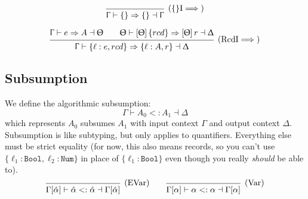 \documentclass{article}
\newcommand{\rcd}[1]{\{#1\}}
\newcommand{\spc}{\qquad}
\newcommand{\ctx}{\Upgamma}
\newcommand{\ctxalt}{\Updelta}
\newcommand{\ctxaltt}{\Uptheta}
\newcommand{\lbl}{\ell}
\newcommand{\row}{r}
\newcommand{\ev}{\hat}
\newcommand{\ctxinout}[3]{#1 \vdash #2 \dashv #3}
\newcommand{\synth}[4]{\ctxinout {#1} {#2 \Rightarrow #3} {#4}}
\renewcommand{\check}[4]{\ctxinout {#1} {#2 \Leftarrow #3} {#4}}
\newcommand{\subsume}{<:}
\newcommand{\subsumes}[4]{\ctxinout {#1} {#2 \subsume #3} {#4}}
\newcommand{\synthesizes}{\Rightarrow \!\!\! \Rightarrow}
\newcommand{\presynth}[6]{\ctxinout {#1} {#2 #3 #4 \synthesizes #5} {#6}}
\newcommand{\B}{\mathcal{B}}
\newcommand{\prjSymbol}{.}
\newcommand{\prj}{\,\prjSymbol\,}
\newcommand{\apply}[1]{\left[#1\right]}
\newcommand{\lookup}[5]{#1 \vdash #2 \# #3 \longrightarrow #4 \dashv #5}
\newcommand{\deduct}[3][]
{
  \begin{prooftree}
    \hypo{#2}
    \infer1[\text{#1}]{#3}
  \end{prooftree}
}
\begin{document}
\[
\deduct[(\{\}I\(\implies\))]{}{\synth{\ctx}{\{\}}{\{\}}{\ctx}}
\]

\[
  \deduct[(RcdI\(\implies\))]
  { \synth{\ctx}{e}{A}{\ctxaltt} \spc \synth{\ctxaltt}{\apply\ctxaltt \rcd
        {rcd}}{\apply\ctxaltt \row}{\ctxalt} }
  { \synth{\ctx}{\{\lbl : e , rcd \}}{\{\lbl : A, \row\}}{\ctxalt} }
\]






\subsection{Subsumption}
We define the algorithmic subsumption:
\[
\subsumes{\Gamma}{A_0}{A_1}{\Delta}
\]
which represents $A_0$ subsumes $A_1$ with input context $\Gamma$ and output
context $\Delta$. Subsumption is like subtyping, but only applies to
quantifiers. Everything else must be strict equality (for now, this also means
records, so you can't use \(\{\lbl_1: \texttt{Bool}, \lbl_2: \texttt{Num}\}\) in
place of \(\{\lbl_1 : \texttt{Bool}\}\) even though you really \emph{should} be
able to).
\[
  \deduct[(EVar)]{}{\subsumes{\Gamma[\ev\alpha]}{\ev\alpha}{\ev\alpha}{\Gamma[\ev\alpha]}}
  \spc
  \deduct[(Var)]{}{\subsumes{\Gamma[\alpha]}{\alpha}{\alpha}{\Gamma[\alpha]}}
\]
\end{document}
